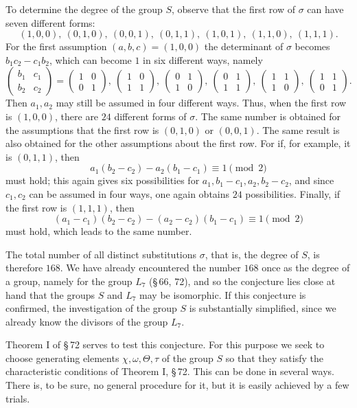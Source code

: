 \documentclass[11pt]{article}
\providecommand{\mat}[4]{\begin{pmatrix}#1&#2\\#3&#4\end{pmatrix}}
\providecommand{\mat}[4]{\begin{pmatrix}#1&#2\\#3&#4\end{pmatrix}}
\providecommand{\mat}[1]{\begin{pmatrix}#1\end{pmatrix}}
\begin{document}
To determine the degree of the group $S$, observe that the first row of $\sigma$ can have seven different forms:
\[
 (1,0,0),\ (0,1,0),\ (0,0,1),\ (0,1,1),\ (1,0,1),\ (1,1,0),\ (1,1,1).
\]
For the first assumption $(a,b,c)=(1,0,0)$ the determinant of $\sigma$ becomes $b_1c_2-c_1b_2$, which can become $1$ in six different ways, namely
\[
 \mat{b_1}{c_1}{b_2}{c_2}=\mat{1}{0}{0}{1},\ \mat{1}{0}{1}{1},\ \mat{0}{1}{1}{0},\ \mat{0}{1}{1}{1},\ \mat{1}{1}{1}{0},\ \mat{1}{1}{0}{1}.
\]
Then $a_1,a_2$ may still be assumed in four different ways. Thus, when the first row is $(1,0,0)$, there are $24$ different forms of $\sigma$. The same number is obtained for the assumptions that the first row is $(0,1,0)$ or $(0,0,1)$. The same result is also obtained for the other assumptions about the first row. For if, for example, it is $(0,1,1)$, then
\[
 a_1(b_2-c_2)-a_2(b_1-c_1)\equiv 1\pmod 2
\]
must hold; this again gives six possibilities for $a_1,b_1-c_1,a_2,b_2-c_2$, and since $c_1,c_2$ can be assumed in four ways, one again obtains $24$ possibilities. Finally, if the first row is $(1,1,1)$, then
\[
 (a_1-c_1)(b_2-c_2)-(a_2-c_2)(b_1-c_1)\equiv 1\pmod 2
\]
must hold, which leads to the same number.

The total number of all distinct substitutions $\sigma$, that is, the degree of $S$, is therefore $168$. We have already encountered the number $168$ once as the degree of a group, namely for the group $L_7$ (\S\,66, 72), and so the conjecture lies close at hand that the groups $S$ and $L_7$ may be isomorphic. If this conjecture is confirmed, the investigation of the group $S$ is substantially simplified, since we already know the divisors of the group $L_7$.

Theorem I of \S\,72 serves to test this conjecture. For this purpose we seek to choose generating elements $\chi,\omega,\Theta,\tau$ of the group $S$ so that they satisfy the characteristic conditions of Theorem I, \S\,72. This can be done in several ways. There is, to be sure, no general procedure for it, but it is easily achieved by a few trials.
\end{document}
